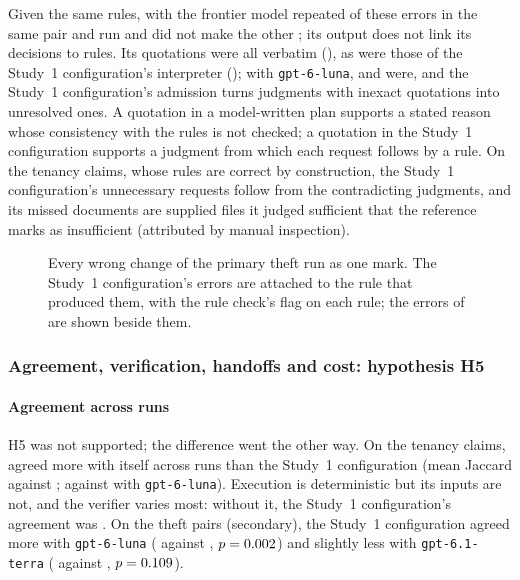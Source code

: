 Given the same rules,  with the frontier model repeated \ecFaultyAlsoR{} of these \ecWrongFaulty{} errors in the same pair and run and did not make the other \ecFaultyAvoidedR; its output does not link its decisions to rules. Its quotations were all verbatim (\citBone), as were those of the Study~1 configuration's interpreter (\citCPProp); with \texttt{gpt-6-luna}, \pct{\citLunaBoneExact} and \pct{\citLunaCPPropExact} were, and the Study~1 configuration's admission turns judgments with inexact quotations into unresolved ones. A quotation in a model-written plan supports a stated reason whose consistency with the rules is not checked; a quotation in the Study~1 configuration supports a judgment from which each request follows by a rule. On the tenancy claims, whose rules are correct by construction, the Study~1 configuration's \tenTerraCPxFP{} unnecessary requests follow from the \jaFlipped{} contradicting judgments, and its \tenTerraCPxMissN{} missed documents are supplied files it judged sufficient that the reference marks as insufficient (attributed by manual inspection).

\begin{figure}[t]
\centering
{}
\caption{Every wrong change of the primary theft run as one mark. The Study~1 configuration's errors are attached to the rule that produced them, with the rule check's flag on each rule; the errors of  are shown beside them.}
\label{fig:trace}
\end{figure}

\subsubsection{Agreement, verification, handoffs and cost: hypothesis H5}
\label{sec:results-cost}

\paragraph{Agreement across runs}
H5 was not supported; the difference went the other way. On the tenancy claims,  agreed more with itself across runs than the Study~1 configuration (mean Jaccard \ctTerraHFiveB{} against \ctTerraHFiveA; \ctLunaHFiveB{} against \ctLunaHFiveA{} with \texttt{gpt-6-luna}). Execution is deterministic but its inputs are not, and the verifier varies most: without it, the Study~1 configuration's agreement was \tenTerraCPxnRetest. On the theft pairs (secondary), the Study~1 configuration agreed more with \texttt{gpt-6-luna} (\ctLunaHFiveThRA{} against \ctLunaHFiveThRB, $p=0.002$) and slightly less with \texttt{gpt-6.1-terra} (\ctTerraHFiveThRA{} against \ctTerraHFiveThRB, $p=0.109$).

